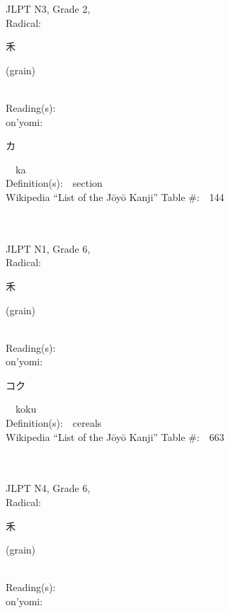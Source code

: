 \begin{multicols}{2}
{JLPT N3, Grade 2, \\Radical:\ \ {\begin{CJK}{UTF8}{min} 禾 \end{CJK}} (grain) } \\
Reading(s):\ \ \\
{\hspace*{1em}}on'yomi:\ \ \\
{\hspace*{2em}}{\begin{CJK}{UTF8}{min} カ \end{CJK}}\ \ ka\ \ \\
Definition(s):\ \ section \\
Wikipedia ``List of the J\=oy\=o Kanji'' Table \#:\ \ 144 \\
\ \ \\
{\fontsize{34pt}{40pt}  }\ \ \\  %
{JLPT N1, Grade 6, \\Radical:\ \ {\begin{CJK}{UTF8}{min} 禾 \end{CJK}} (grain) } \\
Reading(s):\ \ \\
{\hspace*{1em}}on'yomi:\ \ \\
{\hspace*{2em}}{\begin{CJK}{UTF8}{min} コク \end{CJK}}\ \ koku\ \ \\
Definition(s):\ \ cereals \\
Wikipedia ``List of the J\=oy\=o Kanji'' Table \#:\ \ 663 \\
\ \ \\
{\fontsize{34pt}{40pt}  }\ \ \\  %
{JLPT N4, Grade 6, \\Radical:\ \ {\begin{CJK}{UTF8}{min} 禾 \end{CJK}} (grain) } \\
Reading(s):\ \ \\
{\hspace*{1em}}on'yomi:\ \ \\

\end{multicols}
